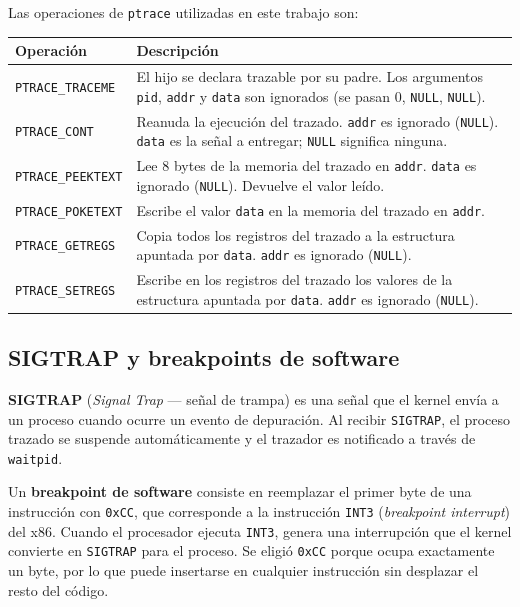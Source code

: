 \documentclass[10pt,a4paper]{article}
\begin{document}
Las operaciones de \texttt{ptrace} utilizadas en este trabajo son:

\begin{center}
\begin{tabular}{lp{8.5cm}}
\toprule
\textbf{Operación} & \textbf{Descripción} \\
\midrule
\texttt{PTRACE\_TRACEME}  & El hijo se declara trazable por su padre. Los argumentos \texttt{pid}, \texttt{addr} y \texttt{data} son ignorados (se pasan 0, \texttt{NULL}, \texttt{NULL}). \\[4pt]
\texttt{PTRACE\_CONT}     & Reanuda la ejecución del trazado. \texttt{addr} es ignorado (\texttt{NULL}). \texttt{data} es la señal a entregar; \texttt{NULL} significa ninguna. \\[4pt]
\texttt{PTRACE\_PEEKTEXT} & Lee 8 bytes de la memoria del trazado en \texttt{addr}. \texttt{data} es ignorado (\texttt{NULL}). Devuelve el valor leído. \\[4pt]
\texttt{PTRACE\_POKETEXT} & Escribe el valor \texttt{data} en la memoria del trazado en \texttt{addr}. \\[4pt]
\texttt{PTRACE\_GETREGS}  & Copia todos los registros del trazado a la estructura apuntada por \texttt{data}. \texttt{addr} es ignorado (\texttt{NULL}). \\[4pt]
\texttt{PTRACE\_SETREGS}  & Escribe en los registros del trazado los valores de la estructura apuntada por \texttt{data}. \texttt{addr} es ignorado (\texttt{NULL}). \\
\bottomrule
\end{tabular}
\end{center}

\subsection{SIGTRAP y breakpoints de software}

\textbf{SIGTRAP} (\textit{Signal Trap} — señal de trampa) es una señal que el kernel envía a un proceso cuando ocurre un evento de depuración. Al recibir \texttt{SIGTRAP}, el proceso trazado se suspende automáticamente y el trazador es notificado a través de \texttt{waitpid}.

Un \textbf{breakpoint de software} consiste en reemplazar el primer byte de una instrucción con \texttt{0xCC}, que corresponde a la instrucción \texttt{INT3} (\textit{breakpoint interrupt}) del x86. Cuando el procesador ejecuta \texttt{INT3}, genera una interrupción que el kernel convierte en \texttt{SIGTRAP} para el proceso. Se eligió \texttt{0xCC} porque ocupa exactamente un byte, por lo que puede insertarse en cualquier instrucción sin desplazar el resto del código.
\end{document}
